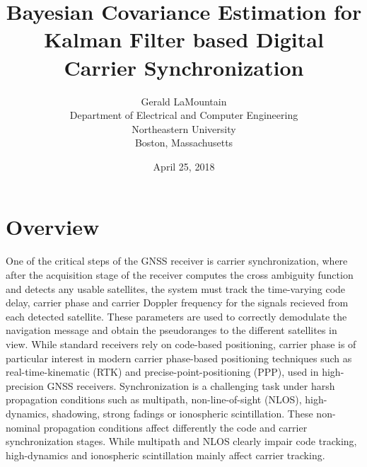 \documentclass[11pt]{article}
\title{Bayesian Covariance Estimation for Kalman Filter based Digital Carrier Synchronization}
\author{Gerald LaMountain\\Department of Electrical and Computer Engineering\\Northeastern University\\Boston, Massachusetts}
\date{April 25, 2018}
\begin{document}





\maketitle

% 
% 
% 

\section{Overview}

One of the critical steps of the GNSS receiver is carrier synchronization, where after the acquisition stage of the receiver computes the cross ambiguity function and detects any usable satellites, the system must track the time-varying code delay, carrier phase and carrier Doppler frequency for the signals recieved from each detected satellite. These parameters are used to correctly demodulate the navigation message and obtain the pseudoranges to the different satellites in view. While standard receivers rely on code-based positioning, carrier phase is of particular interest in modern carrier phase-based positioning techniques such as real-time-kinematic (RTK) and precise-point-positioning (PPP), used in high-precision GNSS receivers. Synchronization is a challenging task under harsh propagation conditions such as multipath, non-line-of-sight (NLOS), high-dynamics, shadowing, strong fadings or ionospheric scintillation. These non-nominal propagation conditions affect differently the code and carrier synchronization stages. While multipath and NLOS clearly impair code tracking, high-dynamics and ionospheric scintillation mainly affect carrier tracking. %
\end{document}
